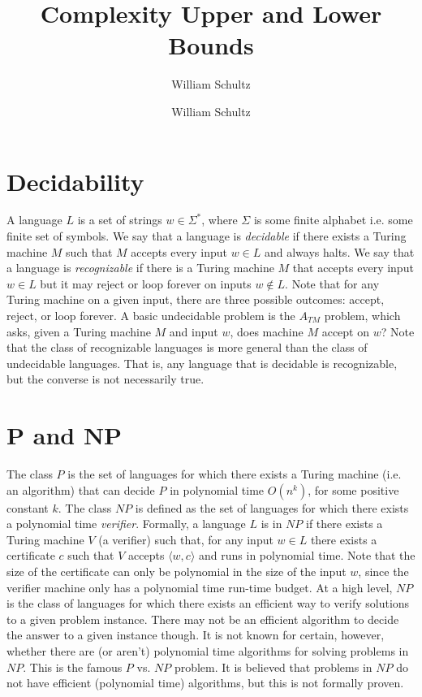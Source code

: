 \documentclass[10pt,a4paper]{article}
\author{William Schultz}
\begin{document}
\title{Complexity Upper and Lower Bounds}
\author{William Schultz}
\maketitle

\section*{Decidability}

A language $L$ is a set of strings $w \in \Sigma^*$, where $\Sigma$ is some finite alphabet i.e. some finite set of symbols. We say that a language is \textit{decidable} if there exists a Turing machine $M$ such that $M$ accepts every input $w \in L$ and always halts. We say that a language is \textit{recognizable} if there is a Turing machine $M$ that accepts every input $w \in L$ but it may reject or loop forever on inputs $w \notin L$. Note that for any Turing machine on a given input, there are three possible outcomes: accept, reject, or loop forever. A basic undecidable problem is the $A_{TM}$ problem, which asks, given a Turing machine $M$ and input $w$, does machine $M$ accept on $w$? Note that the class of recognizable languages is more general than the class of undecidable languages. That is, any language that is decidable is recognizable, but the converse is not necessarily true.

\section*{P and NP}

The class $P$ is the set of languages for which there exists a Turing machine (i.e. an algorithm) that can decide $P$ in polynomial time $O(n^k)$, for some positive constant $k$. The class $NP$ is defined as the set of languages for which there exists a polynomial time \textit{verifier}. Formally, a language $L$ is in $NP$ if there exists a Turing machine $V$ (a verifier) such that, for any input $w \in L$ 
there exists a certificate $c$ such that $V$ accepts $\langle w,c \rangle$ and runs in polynomial time. Note that the size of the certificate can only be polynomial in the size of the input $w$, since the verifier machine only has a polynomial time run-time budget. At a high level, $NP$ is the class of languages for which there exists an efficient way to verify solutions to a given problem instance. There may not be an efficient algorithm to decide the answer to a given instance though. It is not known for certain, however, whether there are (or aren't) polynomial time algorithms for solving problems in $NP$. This is the famous $P$ vs. $NP$ problem. It is believed that problems in $NP$ do not have efficient (polynomial time) algorithms, but this is not formally proven. 
\end{document}
